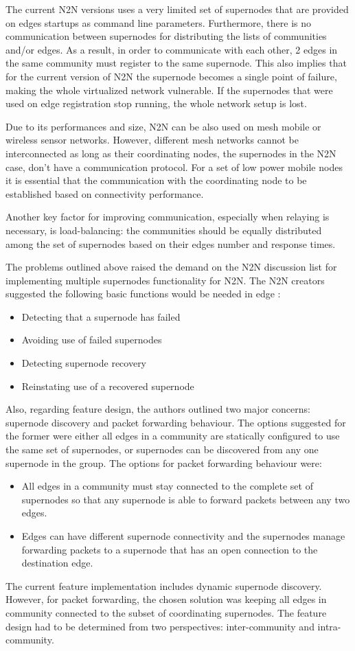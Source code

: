 
The current N2N versions uses a very limited set of supernodes that are provided on edges startups as command line parameters. Furthermore, there is no communication between supernodes for distributing the lists of communities and/or edges. As a result, in order to communicate with each other, 2 edges in the same community must register to the same supernode. This also implies that for the current version of N2N the supernode becomes a single point of failure, making the whole virtualized network vulnerable. If the supernodes that were used on edge registration stop running, the whole network setup is lost.

Due to its performances and size, N2N can be also used on mesh mobile or wireless sensor networks. However, different mesh networks cannot be interconnected as long as their coordinating nodes, the supernodes in the N2N case, don't have a communication protocol. For a set of low power mobile nodes it is essential that the communication with the coordinating node to be established based on connectivity performance.

Another key factor for improving communication, especially when relaying is necessary, is load-balancing: the communities should be equally distributed among the set of supernodes based on their edges number and response times.

The problems outlined above raised the demand on the N2N discussion list \cite{demand} for implementing multiple supernodes functionality for N2N. The N2N creators suggested the following basic functions would be needed in edge \cite{suggestions}:
\begin{itemize}
\item Detecting that a supernode has failed
\item Avoiding use of failed supernodes
\item Detecting supernode recovery
\item Reinstating use of a recovered supernode
\end{itemize}
Also, regarding feature design, the authors outlined two major concerns: supernode discovery and packet forwarding behaviour. The options suggested for the former were either all edges in a community are statically configured to use the same set of supernodes, or supernodes can be discovered from any one supernode in the group. The options for packet forwarding behaviour were:
\begin{itemize}
\item All edges in a community must stay connected to the complete set of supernodes so that any supernode is able to forward packets between any two edges.
\item Edges can have different supernode connectivity and the supernodes manage forwarding packets to a supernode that has an open connection to the destination edge.
\end{itemize}
The current feature implementation includes dynamic supernode discovery. However, for packet forwarding, the chosen solution was keeping all edges in community connected to the subset of coordinating supernodes. The feature design had to be determined from two perspectives: inter-community and intra-community.


